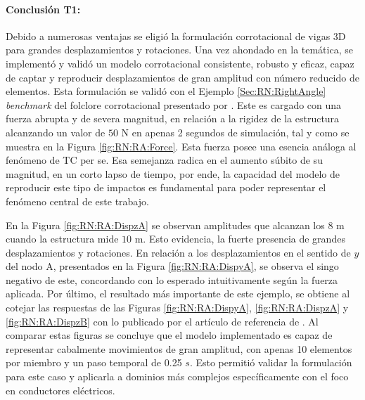 \paragraph*{Conclusión T1:}
Debido a numerosas ventajas se eligió la formulación corrotacional de vigas 3D para grandes desplazamientos y rotaciones. Una vez ahondado en la temática, se implementó y validó un modelo corrotacional consistente, robusto y eficaz, capaz de captar y reproducir desplazamientos de gran amplitud con número reducido de elementos. Esta formulación se validó con el Ejemplo \ref{Sec:RN:RightAngle} \emph{benchmark} del folclore corrotacional presentado por \cite{simo1988dynamics}. Este es cargado con una fuerza abrupta y de severa magnitud, en relación a la rigidez de la estructura alcanzando un valor de $50$ N en apenas 2 segundos de simulación, tal y como se muestra en la Figura \ref{fig:RN:RA:Force}. Esta fuerza posee una esencia análoga al fenómeno de TC per se. Esa semejanza radica en el aumento súbito de su magnitud, en un corto lapso de tiempo, por ende, la capacidad del modelo de reproducir este tipo de impactos es fundamental para poder representar el fenómeno central de este trabajo.

En la Figura \ref{fig:RN:RA:DispzA} se observan amplitudes que alcanzan los $8$ m cuando la estructura mide $10$ m. Esto evidencia, la fuerte presencia de grandes desplazamientos y rotaciones.  En relación a los desplazamientos en el sentido de $y$ del nodo A, presentados en la Figura \ref{fig:RN:RA:DispyA}, se observa el singo negativo de este, concordando con lo esperado intuitivamente según la fuerza aplicada. Por último, el resultado más importante de este ejemplo, se obtiene al cotejar las respuestas de las Figuras \ref{fig:RN:RA:DispyA}, \ref{fig:RN:RA:DispzA} y \ref{fig:RN:RA:DispzB} con lo publicado por el artículo de referencia de \cite{Le2014}. Al comparar estas figuras se concluye que el modelo implementado es capaz de representar cabalmente movimientos de gran amplitud, con apenas 10 elementos por miembro y un paso temporal de 0.25 $s$. Esto permitió validar la formulación para este caso y aplicarla a dominios más complejos específicamente con el foco en conductores eléctricos. 

